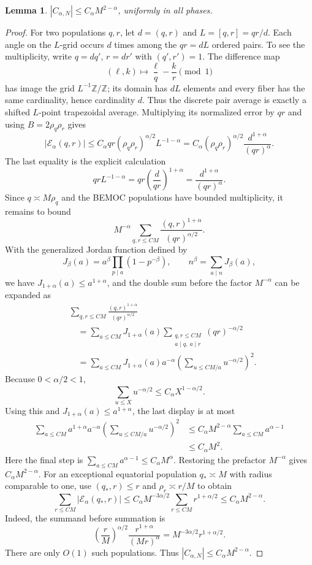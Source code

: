 \documentclass[11pt]{amsart}
\newtheorem{lemma}[theorem]{Lemma}
\begin{document}
\begin{lemma}\label{lem:cross}
$|C_{\alpha,N}|\le C_\alpha M^{2-\alpha}$, uniformly in all phases.
\end{lemma}

\begin{proof}
For two populations $q,r$, let $d=(q,r)$ and $L=[q,r]=qr/d$.  Each angle on
the $L$-grid occurs $d$ times among the $qr=dL$ ordered pairs.  To see the
multiplicity, write $q=dq'$, $r=dr'$ with $(q',r')=1$.  The difference map
\[
 (\ell,k)\longmapsto \frac{\ell}{q}-\frac{k}{r}\pmod1
\]
has image the grid $L^{-1}\mathbb Z/\mathbb Z$; its domain has $dL$
elements and every fiber has the same cardinality, hence cardinality $d$.
Thus the discrete pair average is exactly a shifted $L$-point trapezoidal
average.  Multiplying its normalized error by $qr$ and using
$B=2\rho_q\rho_r$ gives
\[
 |\mathcal E_\alpha(q,r)|
 \le C_\alpha qr(\rho_q\rho_r)^{\alpha/2}L^{-1-\alpha}
 =C_\alpha(\rho_q\rho_r)^{\alpha/2}
 \frac{d^{1+\alpha}}{(qr)^\alpha}.
\]
The last equality is the explicit calculation
\[
 qrL^{-1-\alpha}
 =qr\left(\frac{d}{qr}\right)^{1+\alpha}
 =\frac{d^{1+\alpha}}{(qr)^\alpha}.
\]
Since $q\asymp M\rho_q$ and the BEMOC populations have bounded
multiplicity, it remains to bound
\[
 M^{-\alpha}\sum_{q,r\le CM}
 \frac{(q,r)^{1+\alpha}}{(qr)^{\alpha/2}}.
\]
With the generalized Jordan function defined by
\[
 J_\beta(a)=a^\beta\prod_{p\mid a}(1-p^{-\beta}),\qquad
 n^\beta=\sum_{a\mid n}J_\beta(a),
\]
we have $J_{1+\alpha}(a)\le a^{1+\alpha}$, and the double sum before the
factor $M^{-\alpha}$ can be expanded as
\begin{align*}
 &\sum_{q,r\le CM}
 \frac{(q,r)^{1+\alpha}}{(qr)^{\alpha/2}}\\
 &\quad=\sum_{a\le CM}J_{1+\alpha}(a)
 \sum_{\substack{q,r\le CM\\a\mid q,\ a\mid r}}
 (qr)^{-\alpha/2}\\
 &\quad=\sum_{a\le CM}J_{1+\alpha}(a)a^{-\alpha}
 \left(\sum_{u\le CM/a}u^{-\alpha/2}\right)^2.
\end{align*}
Because $0<\alpha/2<1$,
\[
 \sum_{u\le X}u^{-\alpha/2}\le C_\alpha X^{1-\alpha/2}.
\]
Using this and $J_{1+\alpha}(a)\le a^{1+\alpha}$, the last display is at
most
\begin{align*}
 \sum_{a\le CM}a^{1+\alpha}a^{-\alpha}
 \left(\sum_{u\le CM/a}u^{-\alpha/2}\right)^2
 &\le C_\alpha M^{2-\alpha}
 \sum_{a\le CM}a^{\alpha-1}\\
 &\le C_\alpha M^2.
\end{align*}
Here the final step is
$\sum_{a\le CM}a^{\alpha-1}\le C_\alpha M^\alpha$.
Restoring the prefactor $M^{-\alpha}$ gives
$C_\alpha M^{2-\alpha}$.
For an exceptional equatorial population $q_*\asymp M$ with radius
comparable to one, use $(q_*,r)\le r$ and $\rho_r\asymp r/M$ to obtain
\[
 \sum_{r\le CM}|\mathcal E_\alpha(q_*,r)|
 \le C_\alpha M^{-3\alpha/2}
 \sum_{r\le CM}r^{1+\alpha/2}
 \le C_\alpha M^{2-\alpha}.
\]
Indeed, the summand before summation is
\[
 \left(\frac rM\right)^{\alpha/2}
 \frac{r^{1+\alpha}}{(Mr)^\alpha}
 =M^{-3\alpha/2}r^{1+\alpha/2}.
\]
There are only $O(1)$ such populations.  Thus
$|C_{\alpha,N}|\le C_\alpha M^{2-\alpha}$.
\end{proof}
\end{document}
